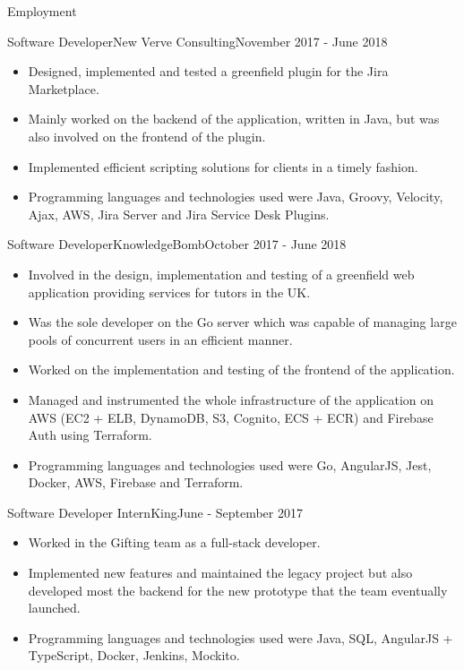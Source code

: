\documentclass[]{cv}
\begin{document}
	\makeheader
	
	\begin{cvsection}{Employment}
		\begin{cvsubsection}{Software Developer}{New Verve Consulting}{November 2017 - June 2018}
			\begin{itemize}
				\item Designed, implemented and tested a greenfield plugin for the Jira Marketplace.
				\item Mainly worked on the backend of the application, written in Java, but was also involved 
				on the frontend of the plugin.
				\item Implemented efficient scripting solutions for clients in a timely fashion.
				\item Programming languages and technologies used were Java, Groovy, Velocity, Ajax, AWS, 
				Jira Server and Jira Service Desk Plugins.
			\end{itemize}
		\end{cvsubsection}
		
		\begin{cvsubsection}{Software Developer}{KnowledgeBomb}{October 2017 - June 2018}	
			\begin{itemize}
				\item Involved in the design, implementation and testing of a greenfield web application 
				providing services for tutors in the UK.
				\item Was the sole developer on the Go server which was capable of managing large pools of concurrent users 
				in an efficient manner.
				\item Worked on the implementation and testing of the frontend of the application.
				\item Managed and instrumented the whole infrastructure of the application on AWS (EC2 + ELB, DynamoDB, S3, Cognito, ECS + ECR)
				and Firebase Auth using Terraform.
				\item Programming languages and technologies used were Go, AngularJS, Jest, Docker, AWS, Firebase and Terraform.
			\end{itemize}
		\end{cvsubsection}
		
		\begin{cvsubsection}{Software Developer Intern}{King}{June - September 2017}
			\begin{itemize}
				\item Worked in the Gifting team as a full-stack developer.
				\item Implemented new features and maintained the legacy project but also developed most the backend for the new prototype that the team eventually launched.
				\item Programming languages and technologies used were Java, SQL, AngularJS + TypeScript, Docker, Jenkins, Mockito.
			\end{itemize}
		\end{cvsubsection}
		

\end{cvsection}
\end{document}
